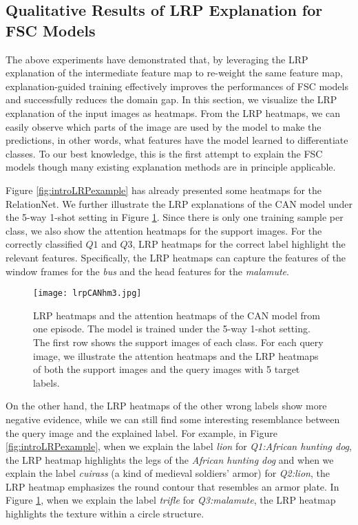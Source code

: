 \documentclass[a4paper,conference]{IEEEtran}
\begin{document}
\subsection{Qualitative Results of LRP Explanation for FSC Models}

The above experiments have demonstrated that, by leveraging the LRP explanation of the intermediate feature map to re-weight the same feature map, explanation-guided training effectively improves the performances of FSC models and successfully reduces the domain gap. In this section, we visualize the LRP explanation of the input images as heatmaps. From the LRP heatmaps, we can easily observe which parts of the image are used by the model to make the predictions, in other words, what features have the model learned to differentiate classes. To our best knowledge, this is the first attempt to explain the FSC models though many existing explanation methods are in principle applicable. 

Figure \ref{fig:introLRPexample} has already presented some heatmaps for the RelationNet. We further illustrate the LRP explanations of the CAN model under the 5-way 1-shot setting in Figure \ref{fig:visualizationCAN}. Since there is only one training sample per class, we also show the attention heatmaps for the support images. 
For the correctly classified $Q1$ and $Q3$, LRP heatmaps for the correct label highlight the relevant features. Specifically, the LRP heatmaps can capture the features of the window frames for the \textit{bus} and the head features for the \textit{malamute}.
\begin{figure}[tb]
    \centering
    \texttt{[image: lrpCANhm3.jpg]}
    \caption{LRP heatmaps and the attention heatmaps of the CAN model from one episode. The model is trained under the 5-way 1-shot setting. The first row shows the support images of each class. For each query image, we illustrate the attention heatmaps and the LRP heatmaps of both the support images and the query images with 5 target labels.}
    \label{fig:visualizationCAN}
\end{figure}

On the other hand, the LRP heatmaps of the other wrong labels show more negative evidence, while we can still find some interesting resemblance between the query image and the explained label. For example, in Figure \ref{fig:introLRPexample}, when we explain the label \textit{lion} for \textit{Q1:African hunting dog}, the LRP heatmap highlights the legs of the \textit{African hunting dog} and when we explain the label \textit{cuirass} (a kind of medieval soldiers' armor) for \textit{Q2:lion}, the LRP heatmap emphasizes the round contour that resembles an armor plate. In Figure \ref{fig:visualizationCAN}, when we explain the label \textit{trifle} for \textit{Q3:malamute}, the LRP heatmap highlights the texture within a circle structure. 
\end{document}
